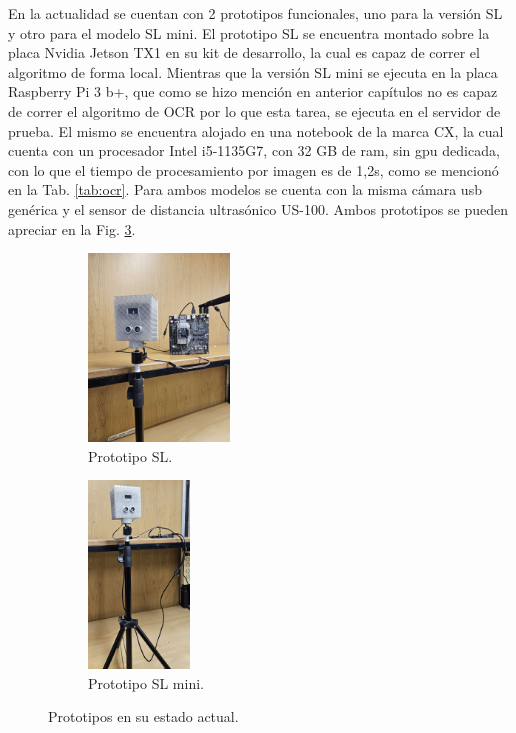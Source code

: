 En la actualidad se cuentan con 2 prototipos funcionales, uno para la versión SL y otro para el modelo SL mini.
El prototipo SL se encuentra montado sobre la placa Nvidia Jetson TX1 en su kit de desarrollo, la cual es capaz de correr el algoritmo de forma local.
Mientras que la versión SL mini se ejecuta en la placa Raspberry Pi 3 b+, que como se hizo mención en anterior capítulos no es capaz de correr el algoritmo de OCR por lo que esta tarea, se ejecuta en el servidor de prueba. El mismo se encuentra alojado en una notebook de la marca CX, la cual cuenta con un procesador Intel i5-1135G7, con 32 GB de ram, sin gpu dedicada, con lo que el tiempo de procesamiento por imagen es de 1,2s, como se mencionó en la Tab. \ref{tab:ocr}.
Para ambos modelos se cuenta con la misma cámara usb genérica y el sensor de distancia ultrasónico US-100.
Ambos prototipos se pueden apreciar en la Fig. \ref{fig:prototipos}.
\begin{figure}[bth]
    \begin{subfigure}{.45\textwidth}
        \centering
        \includegraphics[height=5cm]{imgs/prototipo-sl.jpeg}
        \caption{Prototipo SL.}
        \label{fig:prot-sl}
    \end{subfigure}
    \begin{subfigure}{.45\textwidth}
        \centering
        \includegraphics[height=5cm]{imgs/prototipo-sl-mini.jpeg}
        \caption{Prototipo SL mini.}
        \label{fig:prot-sl-mini}
    \end{subfigure}
    \caption{Prototipos en su estado actual.}
    \label{fig:prototipos}
\end{figure}



